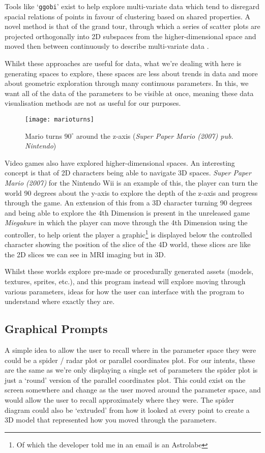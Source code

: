 Tools like `\verb|ggobi|' exist to help explore multi-variate data
\citep{swayne:dsc2003} which tend to disregard spacial relations of points in
favour of clustering based on shared properties. A novel method is that of the
grand tour, through which a series of scatter plots are projected orthogonally
into 2D subspaces from the higher-dimensional space and moved then between
continuously to describe multi-variate data \citep{asimov1985grand}.

Whilst these approaches are useful for data, what we're dealing with here is
generating spaces to explore, these spaces are less about trends in data and
more about geometric exploration through many continuous parameters. In this, we
want all of the data of the parameters to be visible at once, meaning these data
visualisation methods are not as useful for our purposes.

\begin{figure}[H]
    \centering
    \texttt{[image: marioturns]}
    \caption{Mario turns $90^\circ$ around the z-axis (\emph{Super Paper Mario
    (2007) pub. Nintendo})}
\end{figure}

Video games also have explored higher-dimensional spaces. An interesting concept
is that of 2D characters being able to navigate 3D spaces.  \emph{Super Paper
Mario (2007)} for the Nintendo Wii is an example of this, the player can turn
the world 90 degrees about the y-axis to explore the depth of the z-axis and
progress through the game. An extension of this from a 3D character turning 90
degrees and being able to explore the 4th Dimension is present in the unreleased
game \emph{Miegakure} in which the player can move through the 4th Dimension
using the controller, to help orient the player a graphic\footnote{Of which the
developer told me in an email is an Astrolabe} is displayed below the controlled
character showing the position of the slice of the 4D world, these slices are
like the 2D slices we can see in MRI imaging but in 3D.

Whilst these worlds explore pre-made or procedurally generated assets (models,
textures, sprites, etc.), and this program instead will explore moving through
various parameters, ideas for how the user can interface with the program to
understand where exactly they are.

\subsection{Graphical Prompts}
A simple idea to allow the user to recall where in the parameter space they were
could be a spider / radar plot or parallel coordinates plot. For our intents, these
are the same as we're only displaying a single set of parameters the spider plot
is just a `round' version of the parallel coordinates plot. This could exist on
the screen somewhere and change as the user moved around the parameter space,
and would allow the user to recall approximately where they were. The spider
diagram could also be `extruded' from how it looked at every point to create a
3D model that represented how you moved through the parameters.

